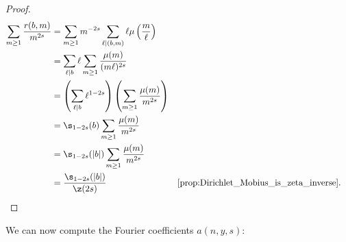 \begin{proof}
\begin{align*}
          \sum_{m \ge 1}\frac{r(b,m)}{m^{2s}} &= \sum_{m \ge 1}m^{-2s}\sum_{\ell \mid (b,m)}\ell\mu\left(\frac{m}{\ell}\right) \\
          &= \sum_{\ell \mid b}\ell\sum_{m \ge 1}\frac{\mu(m)}{(m\ell)^{2s}} \\
          &= \left(\sum_{\ell \mid b}\ell^{1-2s}\right)\left(\sum_{m \ge 1}\frac{\mu(m)}{m^{2s}}\right) \\
          &= \s_{1-2s}(b)\sum_{m \ge 1}\frac{\mu(m)}{m^{2s}} \\
          &= \s_{1-2s}(|b|)\sum_{m \ge 1}\frac{\mu(m)}{m^{2s}} \\
          &= \frac{\s_{1-2s}(|b|)}{\z(2s)} && \text{\cref{prop:Dirichlet_Mobius_is_zeta_inverse}}.
        \end{align*}
      \end{proof}

      We can now compute the Fourier coefficients $a(n,y,s)$:

